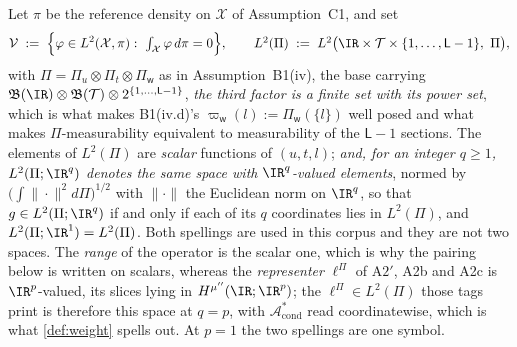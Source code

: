 \begin{definition}\label{def:spaces}
Let $\pi$ be the reference density on $\mathcal X$ of Assumption~C1, and set
\[
\mathcal V\;:=\;\Big\{\varphi\in L^{2}(\mathcal X,\pi):\ \textstyle\int_{\mathcal X}\varphi\,d\pi=0\Big\},
\qquad
L^{2}(\Pi)\;:=\;L^{2}\big(\IR\times\mathcal T\times\{1,\dots,\mathsf L-1\},\ \Pi\big),
\]
with $\Pi=\Pi_u\otimes\Pi_t\otimes\Pi_{\mathsf w}$ as in Assumption~B1(iv), the base carrying
$\mathfrak B(\IR)\otimes\mathfrak B(\mathcal T)\otimes2^{\{1,\dots,\mathsf L-1\}}$, \emph{the third
factor is a finite set with its power set}, which is what makes B1(iv.d)'s
$\varpi_{\mathsf w}(l):=\Pi_{\mathsf w}(\{l\})$ well posed and what makes $\Pi$-measurability equivalent
to measurability of the $\mathsf L-1$ sections.
The elements of $L^{2}(\Pi)$ are
\emph{scalar} functions of $(u,t,l)$; \emph{and, for an integer $q\ge1$, $L^{2}(\Pi;\IR^{q})$ denotes the
same space with $\IR^{q}$-valued elements}, normed by $\big(\int\|\cdot\|^{2}d\Pi\big)^{1/2}$ with
$\|\cdot\|$ the Euclidean norm on $\IR^{q}$, so that $g\in L^{2}(\Pi;\IR^{q})$ if and only if each of its
$q$ coordinates lies in $L^{2}(\Pi)$, and $L^{2}(\Pi;\IR^{1})=L^{2}(\Pi)$. Both spellings are used
in this corpus and they are not two spaces. The \emph{range} of the operator is the scalar one, 
which is why the pairing below is written on scalars, whereas the \emph{representer} $\ell^\Pi$ of A$2'$, A2b and A2c is
$\IR^{p}$-valued, its slices lying in $H^{\mu''}(\IR;\IR^{p})$; the $\ell^\Pi\in L^{2}(\Pi)$ those tags
print is therefore this space at $q=p$, with $\mathcal A^\ast_{\mathrm{cond}}$ read coordinatewise, which
is what \cref{def:weight} spells out. At $p=1$ the two spellings are one symbol.

\end{definition}

